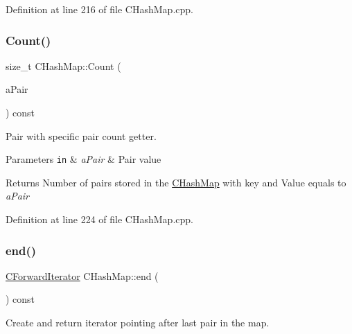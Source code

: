 Definition at line 216 of file C\+Hash\+Map.\+cpp.

\mbox{\label{class_c_hash_map_a4fd67146fd24f86bbb686561a6326ce7}} 
\subsubsection{\texorpdfstring{Count()}{Count()}\hspace{0.1cm}{\footnotesize\ttfamily [3/3]}}
{\footnotesize\ttfamily size\+\_\+t C\+Hash\+Map\+::\+Count (\begin{DoxyParamCaption}\item[{const \hyperlink{class_c_pair}{C\+Pair} \&}]{a\+Pair }\end{DoxyParamCaption}) const}



Pair with specific pair count getter. 


\begin{DoxyParams}[1]{Parameters}
\mbox{\tt in}  & {\em a\+Pair} & Pair value \\
\hline
\end{DoxyParams}
\begin{DoxyReturn}{Returns}
Number of pairs stored in the \hyperlink{class_c_hash_map}{C\+Hash\+Map} with key and Value equals to {\itshape a\+Pair} 
\end{DoxyReturn}


Definition at line 224 of file C\+Hash\+Map.\+cpp.

\mbox{\label{class_c_hash_map_a3129d3b5595237ab172fe060c072c376}} 
\subsubsection{\texorpdfstring{end()}{end()}}
{\footnotesize\ttfamily \hyperlink{class_c_hash_map_1_1_c_forward_iterator}{C\+Forward\+Iterator} C\+Hash\+Map\+::end (\begin{DoxyParamCaption}{ }\end{DoxyParamCaption}) const\hspace{0.3cm}{\ttfamily [inline]}}



Create and return iterator pointing after last pair in the map. 

